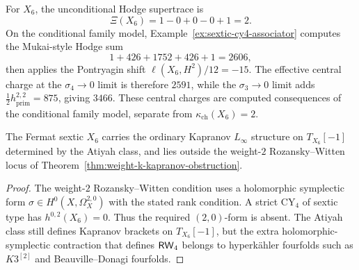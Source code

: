\begin{remark}
\label{rem:cy4-sextic-consequences}
For \(X_6\), the unconditional Hodge supertrace is
\[
  \Xi(X_6)=1-0+0-0+1=2.
\]
On the conditional family model, Example~\ref{ex:sextic-cy4-associator}
computes the Mukai-style Hodge sum
\[
  1+426+1752+426+1=2606,
\]
then applies the Pontryagin shift \(\ell(X_6,H^2)/12=-15\). The effective
central charge at the \(\sigma_4\to0\) limit is therefore \(2591\), while
the \(\sigma_3\to0\) limit adds
\(\frac12 h^{2,2}_{\mathrm{prim}}=875\), giving \(3466\). These central
charges are computed consequences of the conditional family model, separate
from \(\kappa_{\mathrm{ch}}(X_6)=2\).
\end{remark}

\begin{proposition}
\label{prop:cy4-sextic-outside-rw4}
The Fermat sextic \(X_6\) carries the ordinary Kapranov \(L_\infty\)
structure on \(T_{X_6}[-1]\) determined by the Atiyah class, and lies
outside the weight-\(2\) Rozansky--Witten locus of
Theorem~\ref{thm:weight-k-kapranov-obstruction}.
\end{proposition}

\begin{proof}
The weight-\(2\) Rozansky--Witten condition uses a holomorphic
symplectic form \(\sigma\in H^0(X,\Omega_X^{2,0})\) with the stated rank
condition. A strict CY\(_4\) of sextic type has \(h^{0,2}(X_6)=0\).
Thus the required \((2,0)\)-form is absent. The Atiyah class still
defines Kapranov brackets on \(T_{X_6}[-1]\), but the extra
holomorphic-symplectic contraction that defines \(\mathsf{RW}_{4}\) belongs to
hyperk\"ahler fourfolds such as \(K3^{[2]}\) and Beauville--Donagi
fourfolds.
\end{proof}

